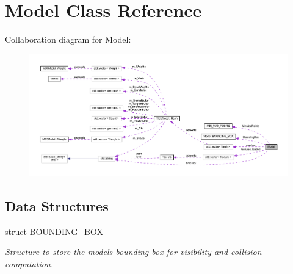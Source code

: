 \hypertarget{class_model}{}\section{Model Class Reference}
\label{class_model}


Collaboration diagram for Model\+:
\nopagebreak
\begin{figure}[H]
\begin{center}
\leavevmode
\includegraphics[width=350pt]{class_model__coll__graph}
\end{center}
\end{figure}
\subsection*{Data Structures}
\begin{DoxyCompactItemize}
\item 
struct \hyperlink{struct_model_1_1_b_o_u_n_d_i_n_g___b_o_x}{B\+O\+U\+N\+D\+I\+N\+G\+\_\+\+B\+OX}
\begin{DoxyCompactList}\small\item\em Structure to store the models bounding box for visibility and collision computation. \end{DoxyCompactList}\end{DoxyCompactItemize}
